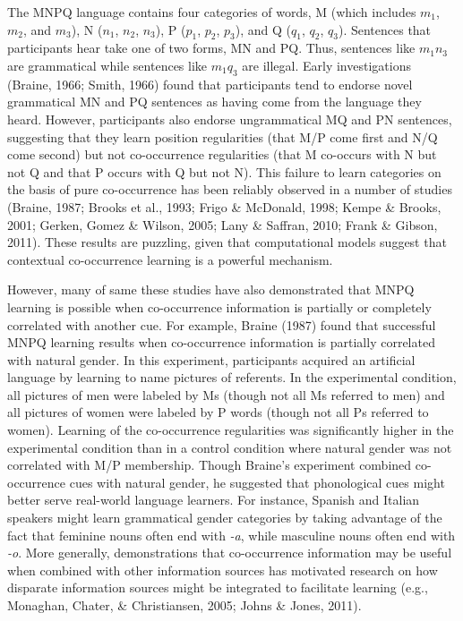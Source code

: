 \documentclass[man,floatsintext]{apa6}
\begin{document}
The MNPQ language contains four categories of words, M (which includes $m_1$, $m_2$, and $m_3$), N ($n_1$, $n_2$, $n_3$), P ($p_1$, $p_2$, $p_3$), and Q ($q_1$, $q_2$, $q_3$). Sentences that participants hear take one of two forms, MN and PQ. Thus, sentences like $m_1 n_3$ are grammatical while sentences like $m_1 q_3$ are illegal. Early investigations (Braine, 1966; Smith, 1966) found that participants tend to endorse novel grammatical MN and PQ sentences as having come from the language they heard. However, participants also endorse ungrammatical MQ and PN sentences, suggesting that they learn position regularities (that M/P come first and N/Q come second) but not co-occurrence regularities (that M co-occurs with N but not Q and that P occurs with Q but not N). This failure to learn categories on the basis of pure co-occurrence has been reliably observed in a number of studies (Braine, 1987; Brooks et al., 1993; Frigo \& McDonald, 1998; Kempe \& Brooks, 2001; Gerken, Gomez \& Wilson, 2005; Lany \& Saffran, 2010; Frank \& Gibson, 2011). These results are puzzling, given that computational models suggest that contextual co-occurrence learning is a powerful mechanism.

However, many of same these studies have also demonstrated that MNPQ learning is possible when co-occurrence information is partially or completely correlated with another cue. For example, Braine (1987) found that successful MNPQ learning results when co-occurrence information is partially correlated with natural gender. In this experiment, participants acquired an artificial language by learning to name pictures of referents. In the experimental condition, all pictures of men were labeled by Ms (though not all Ms referred to men) and all pictures of women were labeled by P words (though not all Ps referred to women). Learning of the co-occurrence regularities was significantly higher in the experimental condition than in a control condition where natural gender was not correlated with M/P membership. Though Braine's experiment combined co-occurrence cues with natural gender, he suggested that phonological cues might better serve real-world language learners. For instance, Spanish and Italian speakers might learn grammatical gender categories by taking advantage of the fact that feminine nouns often end with \emph{-a}, while masculine nouns often end with \emph{-o}. More generally, demonstrations that co-occurrence information may be useful when combined with other information sources has motivated research on how disparate information sources might be integrated to facilitate learning (e.g., Monaghan, Chater, \& Christiansen, 2005; Johns \& Jones, 2011).
\end{document}
